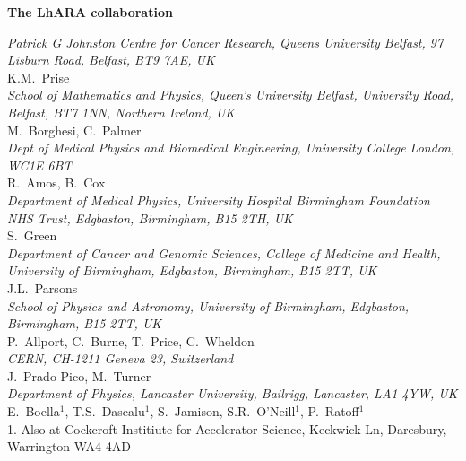 \vspace{0.75cm}
\begin{center}
  {\bf \color{BlueViolet} The LhARA collaboration} \\
  \vspace{0.25cm}
\end{center}
\noindent \textit{Patrick G Johnston Centre for Cancer Research, Queens University Belfast, 97 Lisburn Road, Belfast, BT9 7AE, UK} \\
K.M.~Prise \\
 
\noindent \textit{School of Mathematics and Physics, Queen's University Belfast, University Road, Belfast, BT7 1NN, Northern Ireland, UK} \\
M.~Borghesi, C.~Palmer \\
 
\noindent \textit{Dept of Medical Physics and Biomedical Engineering, University College London, WC1E 6BT} \\
R.~Amos, B.~Cox \\
 
\noindent \textit{Department of Medical Physics, University Hospital Birmingham Foundation NHS Trust, Edgbaston, Birmingham, B15 2TH, UK} \\
S.~Green \\
 
\noindent \textit{Department of Cancer and Genomic Sciences, College of Medicine and Health, University of Birmingham, Edgbaston, Birmingham, B15 2TT, UK} \\
J.L.~Parsons \\
 
\noindent \textit{School of Physics and Astronomy, University of Birmingham, Edgbaston, Birmingham, B15 2TT, UK} \\
P.~Allport, C.~Burne, T.~Price, C.~Wheldon \\
 
\noindent \textit{CERN, CH-1211 Geneva 23, Switzerland} \\
J.~Prado Pico, M.~Turner \\
 
\noindent \textit{Department of Physics, Lancaster University, Bailrigg, Lancaster, LA1 4YW, UK} \\
E.~Boella$^{1}$, T.S.~Dascalu$^{1}$, S.~Jamison, S.R.~O'Neill$^{1}$, P.~Ratoff$^{1}$ \\
{\footnotesize
  1. Also at Cockcroft Institiute for Accelerator Science, Keckwick Ln, Daresbury, Warrington WA4 4AD \\
}
 
